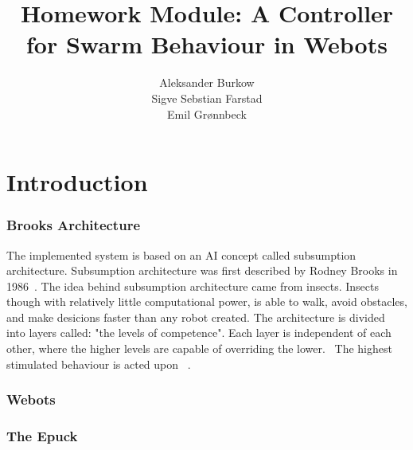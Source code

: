 \documentclass[a4paper]{article}
\title{Homework Module: A Controller for Swarm Behaviour in Webots}
\author{
    Aleksander Burkow \\
    Sigve Sebstian Farstad \\
    Emil Grønnbeck
}
\begin{document}
\maketitle
\thispagestyle{empty}


\newpage

\setcounter{page}{1}

\part{Introduction}

\section{Brooks Architecture}
The implemented system is based on an AI concept called subsumption architecture.
Subsumption architecture was first described by Rodney Brooks in 1986~\cite{brooks}.
The idea behind subsumption architecture came from insects.
Insects though with relatively little computational power, is able to walk, avoid obstacles, and make desicions faster than any robot created.
The architecture is divided into layers called: "the levels of competence".
Each layer is  independent of each other, where the higher levels are capable of overriding the lower.~\cite{mwarnerwu}
The highest stimulated behaviour is acted upon ~\cite{berg-karud}.

\section{Webots}
\section{The Epuck}
\end{document}
